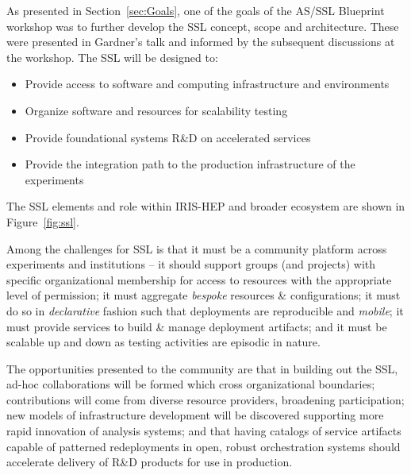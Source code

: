 \documentclass[11pt,letterpaper,fleqn]{article}
\begin{document}
As presented in Section~\ref{sec:Goals}, one of the goals of the AS/SSL Blueprint workshop was to further develop the SSL concept, scope and architecture. These were presented in Gardner's talk and informed by the subsequent discussions at the workshop. The SSL will be designed to:
\begin{itemize}
  \item Provide access to software and computing infrastructure and environments
  \item Organize software and resources for scalability testing
  \item Provide foundational systems R\&D on accelerated services
  \item Provide the integration path to the production infrastructure of the experiments
\end{itemize}
The SSL elements and role within IRIS-HEP and broader ecosystem are shown in Figure~\ref{fig:ssl}.

Among the challenges for SSL is that it must be a community platform across experiments and institutions -- it should support groups (and projects) with specific organizational membership for access to resources with the appropriate level of permission; it must aggregate {\it bespoke} resources \& configurations; it must do so in {\it declarative} fashion such that deployments are reproducible and {\it mobile}; it must provide services to build \& manage deployment artifacts; and it must be scalable up and down as testing activities are episodic in nature.

The opportunities presented to the community are that in building out the SSL, ad-hoc collaborations will be formed which cross organizational boundaries; contributions will come from diverse resource providers, broadening participation; new models of infrastructure development will be discovered supporting more rapid innovation of analysis systems; and that having catalogs of service artifacts capable of patterned redeployments in open, robust orchestration systems should accelerate delivery of R\&D products for use in production.
\end{document}
